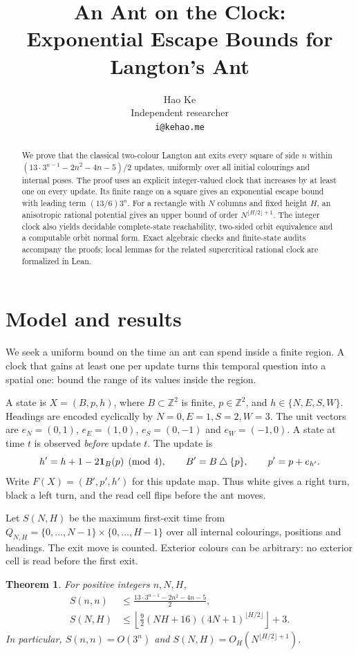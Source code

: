 \documentclass[11pt,a4paper]{article}
\title{An Ant on the Clock:\\Exponential Escape Bounds for Langton's Ant}
\author{Hao Ke\\Independent researcher\\\texttt{i@kehao.me}}
\date{}
\newtheorem{theorem}{Theorem}[section]
\theoremstyle{remark}\newtheorem{remark}[theorem]{Remark}
\newcommand{\Z}{\mathbb Z}\newcommand{\N}{\mathbb N}\newcommand{\Q}{\mathbb Q}
\begin{document}
\maketitle
\begin{abstract}
We prove that the classical two-colour Langton ant exits every square of side
$n$ within $(13\cdot3^{n-1}-2n^2-4n-5)/2$ updates, uniformly over all initial
colourings and internal poses. The proof uses an explicit integer-valued clock
that increases by at least one on every update. Its finite range on a square
gives an exponential escape bound with leading term $(13/6)3^n$.
For a rectangle with $N$ columns and fixed height $H$, an anisotropic rational
potential gives an upper bound of order $N^{\lfloor H/2\rfloor+1}$.
The integer clock also yields decidable complete-state reachability,
two-sided orbit equivalence and a computable orbit normal form.
Exact algebraic checks and finite-state audits accompany the proofs;
local lemmas for the related supercritical rational clock are formalized in Lean.
\end{abstract}

\section{Model and results}
We seek a uniform bound on the time an ant can spend inside a finite region.
A clock that gains at least one per update turns this temporal question into
a spatial one: bound the range of its values inside the region.

A state is $X=(B,p,h)$, where $B\subset\Z^2$ is finite, $p\in\Z^2$, and
$h\in\{N,E,S,W\}$. Headings are encoded cyclically by $N=0,E=1,S=2,W=3$.
The unit vectors are $e_N=(0,1)$, $e_E=(1,0)$, $e_S=(0,-1)$ and $e_W=(-1,0)$.
A state at time $t$ is observed
\emph{before} update $t$. The update is
\begin{equation}\label{eq:rule}
 h'=h+1-2\mathbf1_B(p)\pmod4,\qquad
 B'=B\mathbin{\triangle}\{p\},\qquad p'=p+e_{h'}.
\end{equation}
Write $F(X)=(B',p',h')$ for this update map.
Thus white gives a right turn, black a left turn, and the read cell flips
before the ant moves.

Let $S(N,H)$ be the maximum first-exit time from
$Q_{N,H}=\{0,\ldots,N-1\}\times\{0,\ldots,H-1\}$ over all internal
colourings, positions and headings. The exit move is counted. Exterior colours
can be arbitrary: no exterior cell is read before the first exit.

\begin{theorem}\label{crit:thm:main}
For positive integers $n,N,H$,
\begin{align}
 S(n,n)&\le \frac{13\cdot3^{n-1}-2n^2-4n-5}{2},\label{crit:eq:square}\\
 S(N,H)&\le\left\lfloor\frac92(NH+16)(4N+1)^{\lfloor H/2\rfloor}\right\rfloor+3.
 \label{crit:eq:rectangle}
\end{align}
In particular, $S(n,n)=O(3^n)$ and $S(N,H)=O_H(N^{\lfloor H/2\rfloor+1})$.
\end{theorem}
\end{document}
